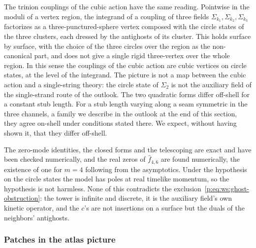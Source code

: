 The trinion couplings of the cubic action have the same reading.
Pointwise in the moduli of a vertex region, the integrand of a coupling of three fields $\Sigma_{k_1}, \Sigma_{k_2}, \Sigma_{k_3}$ factorizes as a three-punctured-sphere vertex composed with the circle states of the three clusters, each dressed by the antighosts of its cluster.
This holds surface by surface, with the choice of the three circles over the region as the non-canonical part, and does not give a single rigid three-vertex over the whole region.
In this sense the couplings of the cubic action are cubic vertices on circle states, at the level of the integrand.
The picture is not a map between the cubic action and a single-string theory: the circle state of $\Sigma_2$ is not the auxiliary field of the single-strand route of the outlook.
The two quadratic forms differ off-shell for a constant stub length.
For a stub length varying along a seam symmetric in the three channels, a family we describe in the outlook at the end of this section, they agree on-shell under conditions stated there.
We expect, without having shown it, that they differ off-shell.

The zero-mode identities, the closed forms and the telescoping are exact and have been checked numerically, and the real zeros of $\hat f_{4,6}$ are found numerically, the existence of one for $m = 4$ following from the asymptotics.
Under the hypothesis on the circle states the model has poles at real timelike momentum, so the hypothesis is not harmless.
None of this contradicts the exclusion~\eqref{p:eq:ws:ghost-obstruction}: the tower is infinite and discrete, it is the auxiliary field's own kinetic operator, and the $c$'s are not insertions on a surface but the duals of the neighbors' antighosts.

\subsubsection{Patches in the atlas picture}
\label{p:sec:ws:atlas}

